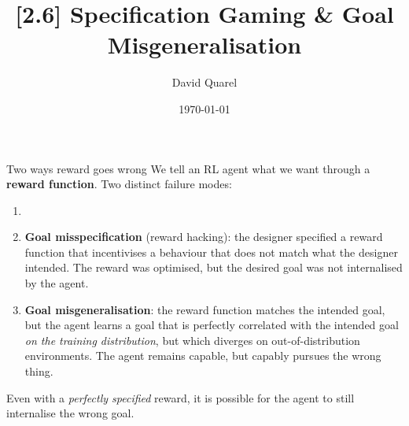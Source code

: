 

\newcommand{\Ra}{\mathcal{R}}
\newcommand{\St}{\mathcal{S}}
\newcommand{\Ac}{\mathcal{A}}



\title[{[2.6] Goal Misgeneralisation}]{{[2.6] Specification Gaming \& Goal Misgeneralisation}}
\author[David Quarel]{David Quarel}
\date[\today]{\today}
\frame{\titlepage}

\begin{frame}{Two ways reward goes wrong}
We tell an RL agent what we want through a \textbf{reward function}. Two distinct failure modes:
\begin{enumerate}
  \item[] \pause
  \item \textbf{Goal misspecification} (reward hacking): the designer specified
  a reward function that incentivises a behaviour that does not match what the designer intended.
  The reward was optimised, but the desired goal was not internalised by the agent.
  \pause
  \item \textbf{Goal misgeneralisation}: the reward function matches the intended goal,
  but the agent learns a goal that is perfectly correlated with the intended goal 
  \emph{on the training distribution}, but which diverges on out-of-distribution environments.
  The agent remains capable, but capably pursues the wrong thing.
\end{enumerate}
\pause
\vfill
Even with a \emph{perfectly specified} reward, it is possible for the agent 
to still internalise the wrong goal.
\end{frame}


